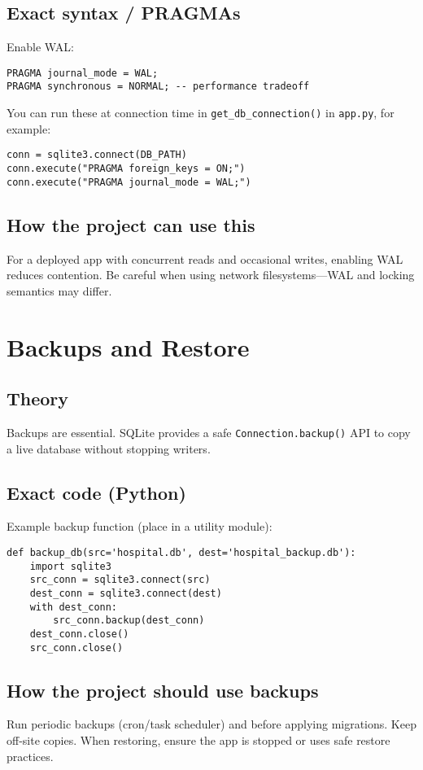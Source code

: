 \documentclass[11pt,a4paper]{article}
\begin{document}
\subsection{Exact syntax / PRAGMAs}
Enable WAL:
\begin{lstlisting}
PRAGMA journal_mode = WAL;
PRAGMA synchronous = NORMAL; -- performance tradeoff
\end{lstlisting}
You can run these at connection time in \texttt{get_db_connection()} in \texttt{app.py}, for example:
\begin{lstlisting}
conn = sqlite3.connect(DB_PATH)
conn.execute("PRAGMA foreign_keys = ON;")
conn.execute("PRAGMA journal_mode = WAL;")
\end{lstlisting}

\subsection{How the project can use this}
For a deployed app with concurrent reads and occasional writes, enabling WAL reduces contention. Be careful when using network filesystems—WAL and locking semantics may differ.

\section{Backups and Restore}
\subsection{Theory}
Backups are essential. SQLite provides a safe \texttt{Connection.backup()} API to copy a live database without stopping writers.

\subsection{Exact code (Python)}
Example backup function (place in a utility module):
\begin{lstlisting}
def backup_db(src='hospital.db', dest='hospital_backup.db'):
    import sqlite3
    src_conn = sqlite3.connect(src)
    dest_conn = sqlite3.connect(dest)
    with dest_conn:
        src_conn.backup(dest_conn)
    dest_conn.close()
    src_conn.close()
\end{lstlisting}

\subsection{How the project should use backups}
Run periodic backups (cron/task scheduler) and before applying migrations. Keep off-site copies. When restoring, ensure the app is stopped or uses safe restore practices.
\end{document}
